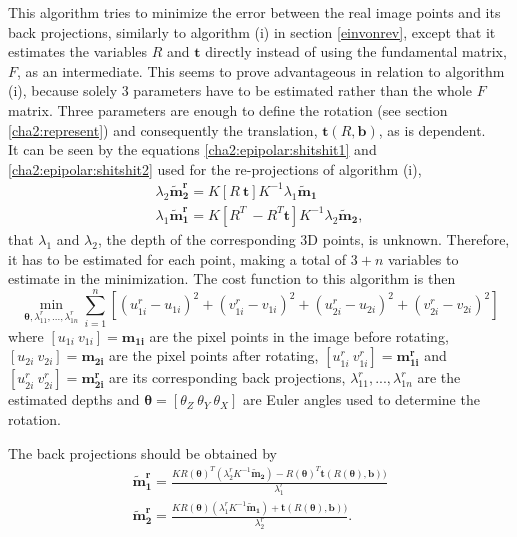 This algorithm tries to minimize the error between the real image points and its back projections, similarly to algorithm (i) in section \ref{einvonrev}, except that it estimates the variables $R$ and $\mathbf{t}$ directly instead of using the fundamental matrix, $F$, as an intermediate. This seems to prove advantageous in relation to algorithm (i), because solely 3 parameters have to be estimated rather than the whole $F$ matrix. Three parameters are enough to define the rotation (see section \ref{cha2:represent}) and consequently the translation, $\mathbf{t}(R, \mathbf{b})$, as is dependent.\\
It can be seen by the equations \ref{cha2:epipolar:shitshit1} and \ref{cha2:epipolar:shitshit2} used for the re-projections of algorithm (i),
\begin{align}
	\lambda_2 \mathbf{\tilde{m}^r_2} = K [ R \ \mathbf{t} ] K^{-1} \lambda_1 \mathbf{\tilde{m}_1}\\
	\lambda_1 \mathbf{\tilde{m}^r_1} =  K [ R^{T} \ -R^{T}\mathbf{t} ]K^{-1} \lambda_2 \mathbf{\tilde{m}_2},
\end{align}
that $\lambda_1$ and $\lambda_2$, the depth of the corresponding 3D points, is unknown. Therefore, it has to be estimated for each point, making a total of $3+n$ variables to estimate in the minimization.
The cost function to this algorithm is then
\begin{equation}
	\min_{\mathbf{\theta}, \lambda^r_{11}, ..., \lambda^r_{1n}} \sum^n_{i=1} [(u^r_{1i}-u_{1i})^2  + (v^r_{1i}-v_{1i})^2 + (u^r_{2i}-u_{2i})^2 + (v^r_{2i}-v_{2i})^2]
\end{equation}
where $[u_{1i} \ v_{1i}] = \mathbf{m_{1i}}$ are the pixel points in the image before rotating, $[u_{2i} \ v_{2i}] = \mathbf{m_{2i}}$ are the pixel points after rotating, $[u_{1i}^r \ v_{1i}^r] = \mathbf{m_{1i}^r}$ and $[u_{2i}^r \ v_{2i}^r] = \mathbf{m_{2i}^r}$ are its corresponding back projections, $\lambda^r_{11}, ..., \lambda^r_{1n}$ are the estimated depths and $\mathbf{\theta} = [\theta_Z \ \theta_Y \ \theta_X]$ are Euler angles used to determine the rotation.

The back projections should be obtained by
\begin{align*}
	\mathbf{\tilde{m}_{1}^r} = \frac{KR(\mathbf{ \theta})^T(\lambda_{2}^r K^{-1}\mathbf{\tilde{m}_2}) - R(\mathbf{ \theta})^T \mathbf{t}(R(\mathbf{ \theta}), \mathbf{b}))}{\lambda_{1}^r}\\
	\mathbf{\tilde{m}_{2}^r} = \frac{KR(\mathbf{ \theta})(\lambda_{1}^r K^{-1}\mathbf{\tilde{m}_1}) + \mathbf{t}(R(\mathbf{ \theta}), \mathbf{b}))}{\lambda_{2}^r}.
\end{align*} 

